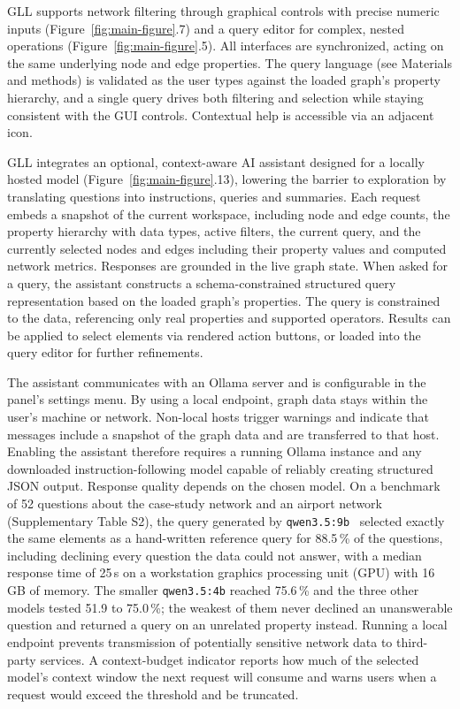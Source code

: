 GLL supports network filtering through graphical controls with precise numeric inputs (Figure~\ref{fig:main-figure}.7) and a query editor for complex, nested operations (Figure~\ref{fig:main-figure}.5). All interfaces are synchronized, acting on the same underlying node and edge properties. The query language (see Materials and methods) is validated as the user types against the loaded graph's property hierarchy, and a single query drives both filtering and selection while staying consistent with the GUI controls. Contextual help is accessible via an adjacent icon.

GLL integrates an optional, context-aware AI assistant designed for a locally hosted model (Figure~\ref{fig:main-figure}.13), lowering the barrier to exploration by translating questions into instructions, queries and summaries. Each request embeds a snapshot of the current workspace, including node and edge counts, the property hierarchy with data types, active filters, the current query, and the currently selected nodes and edges including their property values and computed network metrics. Responses are grounded in the live graph state. When asked for a query, the assistant constructs a schema-constrained structured query representation based on the loaded graph's properties. The query is constrained to the data, referencing only real properties and supported operators. Results can be applied to select elements via rendered action buttons, or loaded into the query editor for further refinements.

The assistant communicates with an Ollama server and is configurable in the panel's settings menu. By using a local endpoint, graph data stays within the user's machine or network. Non-local hosts trigger warnings and indicate that messages include a snapshot of the graph data and are transferred to that host. Enabling the assistant therefore requires a running Ollama instance and any downloaded instruction-following model capable of reliably creating structured JSON output. Response quality depends on the chosen model.
On a benchmark of 52 questions about the case-study network and an airport network (Supplementary Table S2), the query generated by \texttt{qwen3.5:9b}~\citep{qwen3.5} selected exactly the same elements as a hand-written reference query for 88.5\,\% of the questions, including declining every question the data could not answer, with a median response time of 25\,s on a workstation graphics processing unit (GPU) with 16\,GB of memory. The smaller \texttt{qwen3.5:4b} reached 75.6\,\% and the three other models tested 51.9 to 75.0\,\%; the weakest of them never declined an unanswerable question and returned a query on an unrelated property instead. Running a local endpoint prevents transmission of potentially sensitive network data to third-party services. A context-budget indicator reports how much of the selected model's context window the next request will consume and warns users when a request would exceed the threshold and be truncated.

